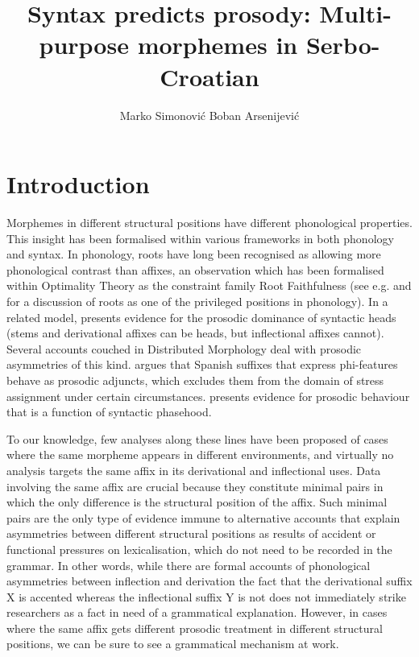 \documentclass[output=paper]{langsci/langscibook}
\author{Marko Simonović\affiliation{University of Nova Gorica}\orcid{0000-0002-9651-6399}\lastand 
 Boban Arsenijević\affiliation{University of Graz}\orcid{0000-0002-1124-6319}}
\title{Syntax predicts prosody: Multi-purpose morphemes in Serbo-Croatian}
\begin{document}
%
\maketitle%
 

\section{Introduction}\label{sec:simonovic:1}

Morphemes in different structural positions have different phonological properties. This insight has been formalised within various frameworks in both phonology and syntax. In phonology, roots have long been recognised as allowing more phonological contrast than affixes, an observation which has been formalised within Optimality Theory as the constraint family Root Faithfulness (see e.g. \citealt{Mcc1993} and  \citealt{Bec1997} for a discussion of roots as one of the privileged positions in phonology). In a related model, \citet{Revithiadou1999} presents evidence for the prosodic dominance of syntactic heads (stems and derivational affixes can be heads, but inflectional affixes cannot). Several accounts couched in Distributed Morphology \citep{Hal1993,Hal1994} deal with pro\-so\-dic asymmetries of this kind. \citet{Don2017} argues that Spanish suffixes that express phi-features behave as prosodic adjuncts, which excludes them from the domain of stress assignment under certain circumstances. \citet{Mar2002} presents evidence for prosodic behaviour that is a function of syntactic phasehood.

To our knowledge, few analyses along these lines have been proposed of cases where the same morpheme appears in different environments, and virtually no analysis targets the same affix in its derivational and inflectional uses. Data involving the same affix are crucial because they constitute minimal pairs in which the only difference is the structural position of the affix. Such minimal pairs are the only type of evidence immune to alternative accounts that explain asymmetries between different structural positions as results of accident or functional pressures on lexicalisation, which do not need to be recorded in the grammar. In other words, while there are formal accounts of phonological asymmetries between inflection and derivation \citep[e.g.][]{Mcc1993, Bec1997, Revithiadou1999} the fact that the derivational suffix X is accented whereas the inflectional suffix Y is not does not immediately strike researchers as a fact in need of a grammatical explanation. However, in cases where the same affix gets different prosodic treatment in different structural positions, we can be sure to see a grammatical mechanism at work. 
\end{document}
